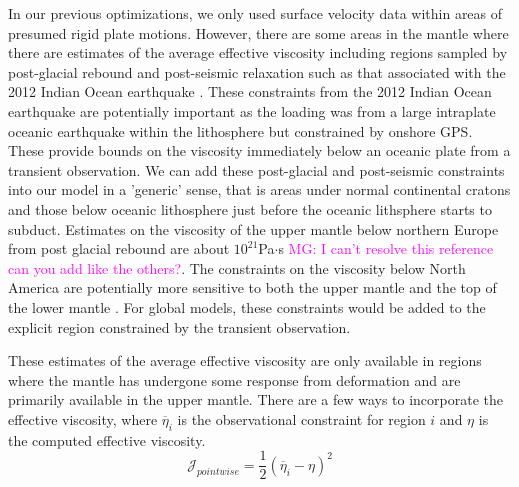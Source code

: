 \documentclass[12pt]{article}
\newcommand{\mgnote}[1]{\textcolor{magenta}{MG: #1}}
\begin{document}
In our previous optimizations, we only used surface velocity data within areas of presumed rigid plate motions. 
However, there are some areas in the mantle where there are estimates of the average effective viscosity including regions sampled by post-glacial rebound and post-seismic relaxation such as that associated with the 2012 Indian Ocean earthquake \citep{hu2016asthenosphere}.  
These constraints from the 2012 Indian Ocean earthquake are potentially important as the loading was from a large intraplate oceanic earthquake within the lithosphere but constrained by onshore GPS. These provide bounds on the viscosity immediately below an oceanic plate from a transient observation. We can add these post-glacial and post-seismic constraints into our model in a 'generic' sense, that is areas under normal continental cratons and those below oceanic lithosphere just before the oceanic lithsphere starts to subduct. Estimates on the viscosity of the upper mantle below northern Europe from post glacial rebound are about $10^{21}$Pa$\cdot$s \mgnote{I can't resolve this reference can you add like the others?}\citep{hu2016asthenosphere}. The constraints on the viscosity below North America are potentially more sensitive to both the upper mantle and the top of the lower mantle \citep{mitrovica1995constraints,simons1997localization}. For global models, these constraints would be added to the explicit region constrained by the transient observation.

These estimates of the average effective viscosity are only available in regions where the mantle has undergone some response from deformation and are primarily available in the upper mantle.   There are a few ways to incorporate the effective viscosity, where $\overline{\eta}_i$ is the observational constraint for region $i$ and $\eta$ is the computed effective viscosity.
\begin{equation}
   \mathcal{J}_{pointwise}=  \frac{1}{2}(\overline{\eta}_i - \eta)^{2}
\label{eq:pointwise}
\end{equation}



 
\end{document}
